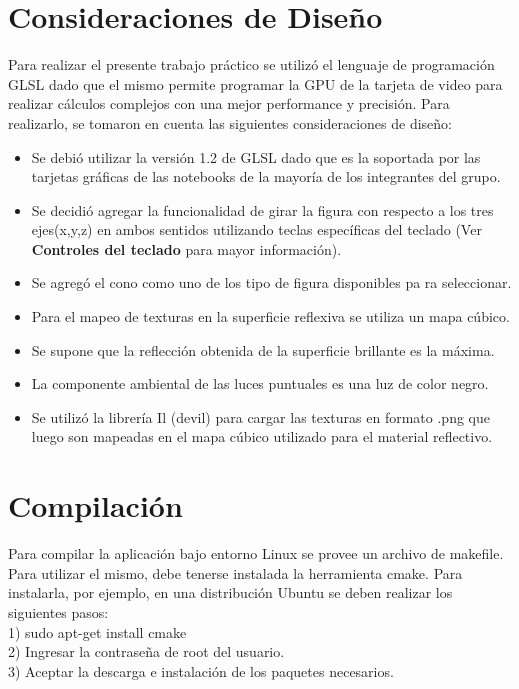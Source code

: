 \documentclass[11pt]{article}
\begin{document}
\begin{center}
\end{center}

\newpage


\section{Consideraciones de Dise\~no}
Para realizar el presente trabajo pr\'actico se utiliz\'o el lenguaje de programaci\'on GLSL dado que el mismo permite programar la GPU 
de la tarjeta de video para realizar c\'alculos complejos con una mejor performance y precisi\'on.
  Para realizarlo, se tomaron en cuenta las siguientes consideraciones de dise\~no:
\begin{itemize} 
 \item Se debi\'o utilizar la versi\'on 1.2 de GLSL dado que es la soportada por las tarjetas gr\'aficas de las notebooks de la mayor\'ia de 
los integrantes del grupo.
 \item Se decidi\'o agregar la funcionalidad de girar la figura con respecto a los tres ejes(x,y,z) en ambos sentidos utilizando teclas espec\'ificas del 
teclado (Ver {\bf Controles del teclado} para mayor informaci\'on).
 \item Se agreg\'o el cono como uno de los tipo de figura disponibles pa
ra seleccionar.
 \item Para el mapeo de texturas en la superficie reflexiva se utiliza un mapa c\'ubico.
 \item Se supone que la reflecci\'on obtenida de la superficie brillante es la m\'axima.
 \item La componente ambiental de las luces puntuales es una luz de color negro.
 \item Se utiliz\'o la librer\'ia Il (devil) para cargar las texturas en formato .png que luego son mapeadas en el mapa c\'ubico utilizado para el 
material reflectivo.
\end{itemize}


\newpage

\section{Compilaci\'on}
  Para compilar la aplicaci\'on bajo entorno Linux se provee un archivo de makefile.
  Para utilizar el mismo, debe tenerse instalada la herramienta cmake. Para instalarla, por ejemplo, en una distribuci\'on Ubuntu se deben 
realizar los siguientes pasos: \\
1) sudo apt-get install cmake \\
2) Ingresar la contrase\~na de root del usuario. \\
3) Aceptar la descarga e instalaci\'on de los paquetes necesarios. \\ 
\end{document}
